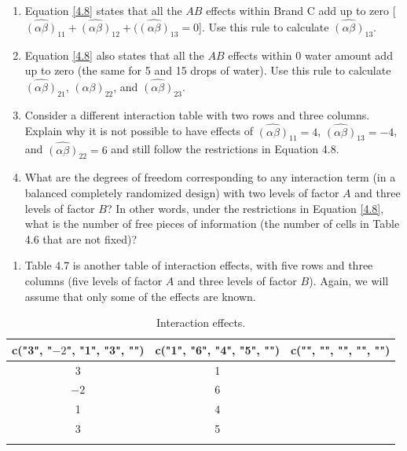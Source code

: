 \documentclass[
]{book}
\providecommand{\tightlist}{%
  \setlength{\itemsep}{0pt}\setlength{\parskip}{0pt}}
\begin{document}
\begin{enumerate}
\def\labelenumi{\alph{enumi}.}
\item
  Equation \ref{4.8} states that all the \(AB\) effects within Brand C add up to zero {[}\(\widehat{(\alpha\beta)}_{11} + \widehat{(\alpha\beta)}_{12} + (\widehat{(\alpha\beta)}_{13} = 0\){]}. Use this rule to calculate \(\widehat{(\alpha\beta)}_{13}\).
\item
  Equation \ref{4.8} also states that all the \(AB\) effects within 0 water amount add up to zero (the same for 5 and 15 drops of water). Use this rule to calculate \(\widehat{(\alpha\beta)}_{21}\), \(\widehat{(\alpha\beta)}_{22}\), and \(\widehat{(\alpha\beta)}_{23}\).
\item
  Consider a different interaction table with two rows and three columns. Explain why it is not possible to have effects of \(\widehat{(\alpha\beta)}_{11} = 4\), \(\widehat{(\alpha\beta)}_{13} = -4\), and \(\widehat{(\alpha\beta)}_{22} = 6\) and still follow the restrictions in Equation 4.8.
\item
  What are the degrees of freedom corresponding to any interaction term (in a balanced completely randomized design) with two levels of factor \(A\) and three levels of factor \(B\)? In other words, under the restrictions in Equation \ref{4.8}, what is the number of free pieces of information (the number of cells in Table 4.6 that are not fixed)?
\end{enumerate}

\begin{enumerate}
\def\labelenumi{\arabic{enumi}.}
\setcounter{enumi}{31}
\tightlist
\item
  Table 4.7 is another table of interaction effects, with five rows and three columns (five levels of factor \(A\) and three levels of factor \(B\)). Again, we will assume that only some of the effects are known.
\end{enumerate}

\begin{table}[!h]
\centering
\caption{\label{tab:tab47}Interaction effects.}
\centering
\begin{tabular}[t]{c|c|c}
\hline
c("3", "$-2$", "1", "3", "") & c("1", "6", "4", "5", "") & c("", "", "", "", "")\\
\hline
3 & 1 & \\
\hline
$-2$ & 6 & \\
\hline
1 & 4 & \\
\hline
3 & 5 & \\
\hline
 &  & \\
\hline
\end{tabular}
\end{table}
\end{document}
